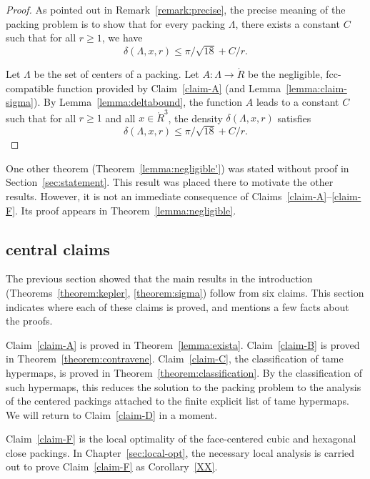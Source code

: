 \begin{proof} As pointed out in Remark~\ref{remark:precise}, the precise
meaning of the packing problem is to show that for every %
packing
$\Lambda$, there exists a constant $C$ such that for all $r\ge 1$,
we have
    $$\delta(\Lambda,x,r)\le\pi/\sqrt{18} + C/r.$$

Let $\Lambda$ be the set of centers of a %
packing.  Let
$A:\Lambda \to \ring{R}$ be the negligible, fcc-compatible
function provided by Claim~\ref{claim-A} (and
Lemma~\ref{lemma:claim-sigma}). By Lemma~\ref{lemma:deltabound},
the function $A$ leads to a constant $C$ such that for all $r\ge
1$ and all $x\in \ring{R}^3$, the density $\delta(\Lambda,x,r)$
satisfies
   $$\delta(\Lambda,x,r) \le \pi/\sqrt{18} + C/r.$$
\end{proof}

\begin{remark}
One other theorem (Theorem~\ref{lemma:negligible'}) was stated
without proof in Section~\ref{sec:statement}.  This result was
placed there to motivate the other results.  However, it is not an
immediate consequence of Claims~\ref{claim-A}--\ref{claim-F}.  Its
proof appears in Theorem~\ref{lemma:negligible}.
\end{remark}

\subsection{central claims}

The previous section showed that the main results in the
introduction (Theorems~\ref{theorem:kepler}, \ref{theorem:sigma})
follow from six claims. This section indicates where each of these
claims is proved, and mentions a few facts about the proofs.

Claim~\ref{claim-A} is proved in Theorem~\ref{lemma:exista}.
Claim~\ref{claim-B} is proved in Theorem~\ref{theorem:contravene}.
Claim~\ref{claim-C}, the classification of tame hypermaps, is
proved in Theorem~\ref{theorem:classification}. By the
classification of such hypermaps, this reduces the solution to the
packing problem to the analysis of the centered packings
attached to the finite explicit list of tame hypermaps.  We will
return to Claim~\ref{claim-D} in a moment.

Claim~\ref{claim-F} is the local optimality of the face-centered
cubic and hexagonal close packings.   In
Chapter~\ref{sec:local-opt}, the necessary local analysis is carried
out to prove Claim~\ref{claim-F} as
Corollary~\ref{XX}.

